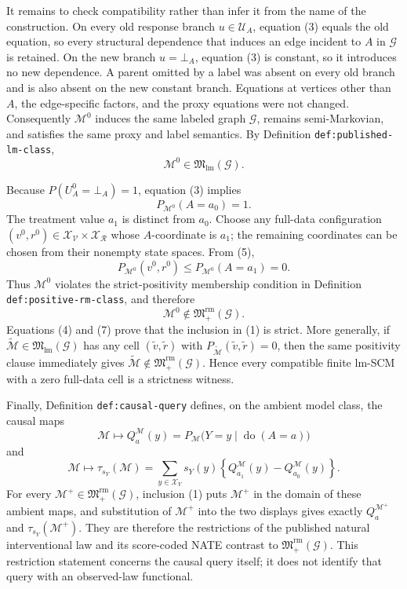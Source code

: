 It remains to check compatibility rather than infer it from the name of the construction.  On every old response branch \(u\in\mathcal U_A\), equation (3) equals the old equation, so every structural dependence that induces an edge incident to \(A\) in \(\mathcal G\) is retained.  On the new branch \(u=\bot_A\), equation (3) is constant, so it introduces no new dependence.  A parent omitted by a label was absent on every old branch and is also absent on the new constant branch.  Equations at vertices other than \(A\), the edge-specific factors, and the proxy equations were not changed.  Consequently \(\mathcal M^{0}\) induces the same labeled graph \(\mathcal G\), remains semi-Markovian, and satisfies the same proxy and label semantics.  By Definition \texttt{def:published-lm-class},
\[
\mathcal M^{0}\in\mathfrak M_{\mathrm{lm}}(\mathcal G).
\tag{4}
\]

Because \(P(U_A^{0}=\bot_A)=1\), equation (3) implies
\[
P_{\mathcal M^{0}}(A=a_0)=1.
\tag{5}
\]
The treatment value \(a_1\) is distinct from \(a_0\).  Choose any full-data configuration \((v^{0},r^{0})\in\mathcal X_{\mathcal V}\times\mathcal X_{\mathcal R}\) whose \(A\)-coordinate is \(a_1\); the remaining coordinates can be chosen from their nonempty state spaces.  From (5),
\[
P_{\mathcal M^{0}}(v^{0},r^{0})
\le P_{\mathcal M^{0}}(A=a_1)=0.
\tag{6}
\]
Thus \(\mathcal M^{0}\) violates the strict-positivity membership condition in Definition \texttt{def:positive-rm-class}, and therefore
\[
\mathcal M^{0}\notin\mathfrak M_{+}^{\mathrm{rm}}(\mathcal G).
\tag{7}
\]
Equations (4) and (7) prove that the inclusion in (1) is strict.  More generally, if \(\widetilde{\mathcal M}\in\mathfrak M_{\mathrm{lm}}(\mathcal G)\) has any cell \((\widetilde v,\widetilde r)\) with \(P_{\widetilde{\mathcal M}}(\widetilde v,\widetilde r)=0\), then the same positivity clause immediately gives \(\widetilde{\mathcal M}\notin\mathfrak M_{+}^{\mathrm{rm}}(\mathcal G)\).  Hence every compatible finite lm-SCM with a zero full-data cell is a strictness witness.

Finally, Definition \texttt{def:causal-query} defines, on the ambient model class, the causal maps
\[
\mathcal M\longmapsto Q_a^{\mathcal M}(y)
=P_{\mathcal M}\bigl(Y=y\mid\operatorname{do}(A=a)\bigr)
\]
and
\[
\mathcal M\longmapsto \tau_{s_Y}(\mathcal M)
=\sum_{y\in\mathcal X_Y}s_Y(y)
\left\{Q_{a_1}^{\mathcal M}(y)-Q_{a_0}^{\mathcal M}(y)\right\}.
\]
For every \(\mathcal M^{+}\in\mathfrak M_{+}^{\mathrm{rm}}(\mathcal G)\), inclusion (1) puts \(\mathcal M^{+}\) in the domain of these ambient maps, and substitution of \(\mathcal M^{+}\) into the two displays gives exactly \(Q_a^{\mathcal M^{+}}\) and \(\tau_{s_Y}(\mathcal M^{+})\).  They are therefore the restrictions of the published natural interventional law and its score-coded NATE contrast to \(\mathfrak M_{+}^{\mathrm{rm}}(\mathcal G)\).  This restriction statement concerns the causal query itself; it does not identify that query with an observed-law functional.